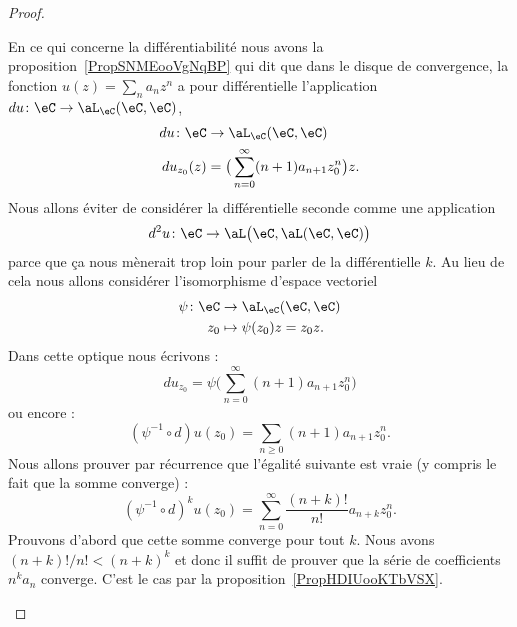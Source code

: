 \begin{proof}
\begin{subproof}
        En ce qui concerne la différentiabilité nous avons la proposition~\ref{PropSNMEooVgNqBP} qui dit que dans le disque de convergence, la fonction \( u(z)=\sum_na_nz^n\) a pour différentielle l'application \( du\colon \eC\to \aL_{\eC}(\eC,\eC)\),
        \begin{equation}
            \begin{aligned}
                du\colon \eC&\to \aL_{\eC}(\eC,\eC) \\
                du_{z_0}(z)&=\big( \sum_{n=0}^{\infty}(n+1)a_{n+1}z_0^n \big)z.
            \end{aligned}
        \end{equation}
        Nous allons éviter de considérer la différentielle seconde comme une application
        \begin{equation}
            d^2u\colon \eC\to \aL\big( \eC,\aL(\eC,\eC) \big)
        \end{equation}
        parce que ça nous mènerait trop loin pour parler de la différentielle \( k\)\ieme. Au lieu de cela nous allons considérer l'isomorphisme d'espace vectoriel
        \begin{equation}
            \begin{aligned}
                \psi\colon \eC&\to \aL_{\eC}(\eC,\eC) \\
                z_0&\mapsto \psi(z_0) z=z_0z.
            \end{aligned}
        \end{equation}
        Dans cette optique nous écrivons :
        \begin{equation}
            du_{z_0}=\psi\big( \sum_{n=0}^{\infty}(n+1)a_{n+1} z_0^n\big)
        \end{equation}
        ou encore :
        \begin{equation}
            (\psi^{-1}\circ d)u(z_0)=\sum_{n\geq 0}(n+1)a_{n+1}z_{0}^n.
        \end{equation}
        Nous allons prouver par récurrence que l'égalité suivante est vraie (y compris le fait que la somme converge) :
        \begin{equation}
            (\psi^{-1}\circ d)^ku(z_0)=\sum_{n=0}^{\infty}\frac{ (n+k)! }{ n! }a_{n+k}z_0^n.
        \end{equation}
        Prouvons d'abord que cette somme converge pour tout \( k\). Nous avons \( (n+k)!/n!<(n+k)^k\) et donc il suffit de prouver que la série de coefficients \( n^ka_n\) converge. C'est le cas par la proposition~\ref{PropHDIUooKTbVSX}.


\end{subproof}
\end{proof}
